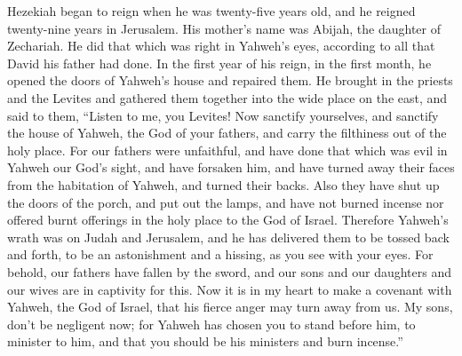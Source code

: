  Hezekiah began to reign when he was twenty-five years
old, and he reigned twenty-nine years in Jerusalem. His mother's name
was Abijah, the daughter of Zechariah.  He did that which
was right in Yahweh's eyes, according to all that David his father had
done.  In the first year of his reign, in the first month,
he opened the doors of Yahweh's house and repaired them. 
He brought in the priests and the Levites and gathered them together
into the wide place on the east,  and said to them,
``Listen to me, you Levites! Now sanctify yourselves, and sanctify the
house of Yahweh, the God of your fathers, and carry the filthiness out
of the holy place.  For our fathers were unfaithful, and
have done that which was evil in Yahweh our God's sight, and have
forsaken him, and have turned away their faces from the habitation of
Yahweh, and turned their backs.  Also they have shut up
the doors of the porch, and put out the lamps, and have not burned
incense nor offered burnt offerings in the holy place to the God of
Israel.  Therefore Yahweh's wrath was on Judah and
Jerusalem, and he has delivered them to be tossed back and forth, to be
an astonishment and a hissing, as you see with your eyes. 
For behold, our fathers have fallen by the sword, and our sons and our
daughters and our wives are in captivity for this.  Now
it is in my heart to make a covenant with Yahweh, the God of Israel,
that his fierce anger may turn away from us.  My sons,
don't be negligent now; for Yahweh has chosen you to stand before him,
to minister to him, and that you should be his ministers and burn
incense.''

